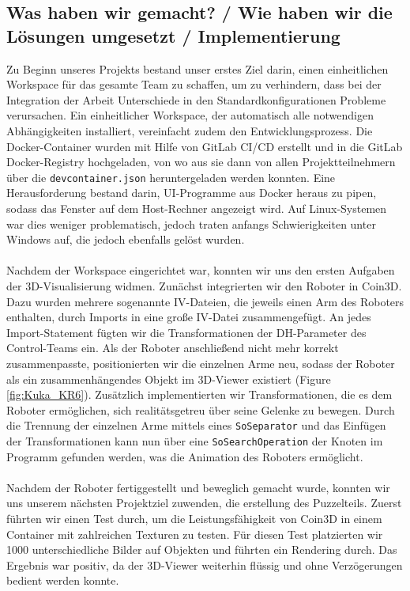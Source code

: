 \subsection{Was haben wir gemacht? / Wie haben wir die Lösungen umgesetzt / Implementierung}
Zu Beginn unseres Projekts bestand unser erstes Ziel darin, einen einheitlichen Workspace für das gesamte Team zu schaffen, um zu verhindern, dass bei der Integration der Arbeit Unterschiede in den Standardkonfigurationen Probleme verursachen. Ein einheitlicher Workspace, der automatisch alle notwendigen Abhängigkeiten installiert, vereinfacht zudem den Entwicklungsprozess. Die Docker-Container wurden mit Hilfe von GitLab CI/CD erstellt und in die GitLab Docker-Registry hochgeladen, von wo aus sie dann von allen Projektteilnehmern über die \texttt{devcontainer.json} heruntergeladen werden konnten. Eine Herausforderung bestand darin, UI-Programme aus Docker heraus zu pipen, sodass das Fenster auf dem Host-Rechner angezeigt wird. Auf Linux-Systemen war dies weniger problematisch, jedoch traten anfangs Schwierigkeiten unter Windows auf, die jedoch ebenfalls gelöst wurden.\\
\\
Nachdem der Workspace eingerichtet war, konnten wir uns den ersten Aufgaben der 3D-Visualisierung widmen. Zunächst integrierten wir den Roboter in Coin3D. Dazu wurden mehrere sogenannte IV-Dateien, die jeweils einen Arm des Roboters enthalten, durch Imports in eine große IV-Datei zusammengefügt. An jedes Import-Statement fügten wir die Transformationen der DH-Parameter des Control-Teams ein. Als der Roboter anschließend nicht mehr korrekt zusammenpasste, positionierten wir die einzelnen Arme neu, sodass der Roboter als ein zusammenhängendes Objekt im 3D-Viewer existiert (Figure \ref{fig:Kuka_KR6}). Zusätzlich implementierten wir Transformationen, die es dem Roboter ermöglichen, sich realitätsgetreu über seine Gelenke zu bewegen. Durch die Trennung der einzelnen Arme mittels eines \texttt{SoSeparator} und das Einfügen der Transformationen kann nun über eine \texttt{SoSearchOperation} der Knoten im Programm gefunden werden, was die Animation des Roboters ermöglicht.\\
\\
Nachdem der Roboter fertiggestellt und beweglich gemacht wurde, konnten wir uns unserem nächsten Projektziel zuwenden, die erstellung des Puzzelteils. Zuerst führten wir einen Test durch, um die Leistungsfähigkeit von Coin3D in einem Container mit zahlreichen Texturen zu testen. Für diesen Test platzierten wir 1000 unterschiedliche Bilder auf Objekten und führten ein Rendering durch. Das Ergebnis war positiv, da der 3D-Viewer weiterhin flüssig und ohne Verzögerungen bedient werden konnte.\\
